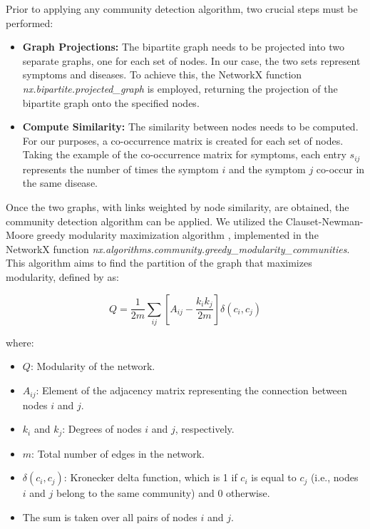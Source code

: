 Prior to applying any community detection algorithm, two crucial steps must be performed:


\begin{itemize}
    \setlength\itemsep{1em} %
    \item \textbf{Graph Projections:} The bipartite graph needs to be projected into two separate graphs, 
    one for each set of nodes. In our case, the two sets represent symptoms and diseases. To achieve this, 
    the NetworkX function \textit{nx.bipartite.projected\_graph} is employed, returning the projection of 
    the bipartite graph onto the specified nodes.
    
    \item \textbf{Compute Similarity:} The similarity between nodes needs to be computed. For our purposes, 
    a co-occurrence matrix is created for each set of nodes. Taking the example of the co-occurrence matrix 
    for symptoms, each entry \(s_{ij}\) represents the number of times the symptom \(i\) and the symptom \(j\) 
    co-occur in the same disease.
\end{itemize}

Once the two graphs, with links weighted by node similarity, are obtained, the community detection algorithm 
can be applied. We utilized the Clauset-Newman-Moore greedy modularity maximization algorithm \cite{Clauset_Newman_Moore_2004}, 
implemented in the NetworkX function \textit{nx.algorithms.community.greedy\_modularity\_communities}. This algorithm aims to 
find the partition of the graph that maximizes modularity, defined by  \cite{Newman_2006} as:

\begin{equation}
    Q = \frac{1}{2m} \sum_{ij} \left[A_{ij} - \frac{k_i k_j}{2m}\right] \delta(c_i, c_j) \label{eq:modularity}
\end{equation}

where:

\begin{itemize}
    \setlength\itemsep{0.4em} %
    \item \(Q\): Modularity of the network.
    \item \(A_{ij}\): Element of the adjacency matrix representing the connection between nodes \(i\) and \(j\).
    \item \(k_i\) and \(k_j\): Degrees of nodes \(i\) and \(j\), respectively.
    \item \(m\): Total number of edges in the network.
    \item \(\delta(c_i, c_j)\): Kronecker delta function, which is 1 if \(c_i\) is equal to \(c_j\) (i.e., nodes \(i\) 
    and \(j\) belong to the same community) and 0 otherwise.
    \item The sum is taken over all pairs of nodes \(i\) and \(j\).
\end{itemize}






